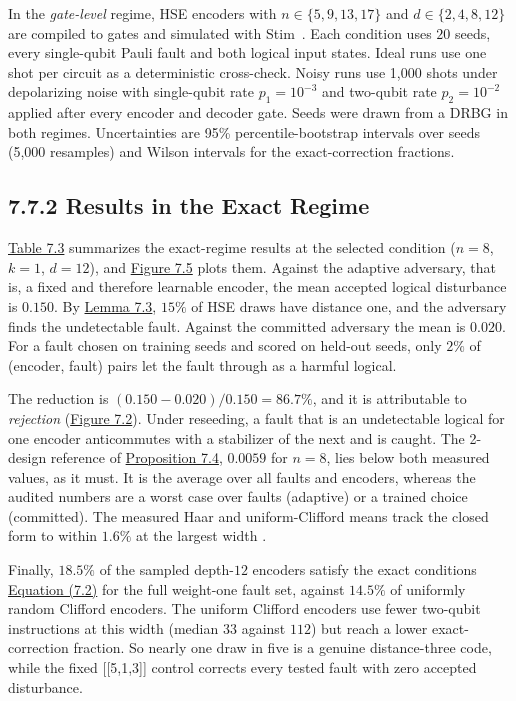 \documentclass{report}
\theoremstyle{plain}
\theoremstyle{definition}
\theoremstyle{remark}
\begin{document}
In the \emph{gate-level} regime, HSE encoders with $n\in\{5,9,13,17\}$ and $d\in\{2,4,8,12\}$ are compiled to gates and simulated with Stim~\cite{gidney2021stim}. Each condition uses $20$ seeds, every single-qubit Pauli fault and both logical input states. Ideal runs use one shot per circuit as a deterministic cross-check. Noisy runs use 1,000 shots under depolarizing noise with single-qubit rate $p_1=10^{-3}$ and two-qubit rate $p_2=10^{-2}$ applied after every encoder and decoder gate. Seeds were drawn from a DRBG in both regimes. Uncertainties are 95\% percentile-bootstrap intervals over seeds (5,000 resamples) and Wilson intervals for the exact-correction fractions.

\subsection{7.7.2 Results in the Exact Regime}\label{sec:qec:results513}

\hyperref[tab:qec:results]{Table 7.3} summarizes the exact-regime results at the selected condition ($n=8$, $k=1$, $d=12$), and \hyperref[fig:qec:disturbance]{Figure 7.5} plots them. Against the adaptive adversary, that is, a fixed and therefore learnable encoder, the mean accepted logical disturbance is $0.150$. By \hyperref[lem:qec:indicator]{Lemma 7.3}, $15\%$ of HSE draws have distance one, and the adversary finds the undetectable fault. Against the committed adversary the mean is $0.020$. For a fault chosen on training seeds and scored on held-out seeds, only $2\%$ of (encoder, fault) pairs let the fault through as a harmful logical.

The reduction is $(0.150-0.020)/0.150=86.7\%$, and it is attributable to \emph{rejection} (\hyperref[fig:qec:adversaries]{Figure 7.2}). Under reseeding, a fault that is an undetectable logical for one encoder anticommutes with a stabilizer of the next and is caught. The 2-design reference of \hyperref[prop:qec:haar]{Proposition 7.4}, $0.0059$ for $n=8$, lies below both measured values, as it must. It is the average over all faults and encoders, whereas the audited numbers are a worst case over faults (adaptive) or a trained choice (committed). The measured Haar and uniform-Clifford means track the closed form to within $1.6\%$ at the largest width \cite{guo2026qecaudit}.

Finally, $18.5\%$ of the sampled depth-$12$ encoders satisfy the exact conditions \hyperref[eq:qec:kl]{Equation (7.2)} for the full weight-one fault set, against $14.5\%$ of uniformly random Clifford encoders. The uniform Clifford encoders use fewer two-qubit instructions at this width (median $33$ against $112$) but reach a lower exact-correction fraction. So nearly one draw in five is a genuine distance-three code, while the fixed [[5,1,3]] control corrects every tested fault with zero accepted disturbance.
\end{document}
